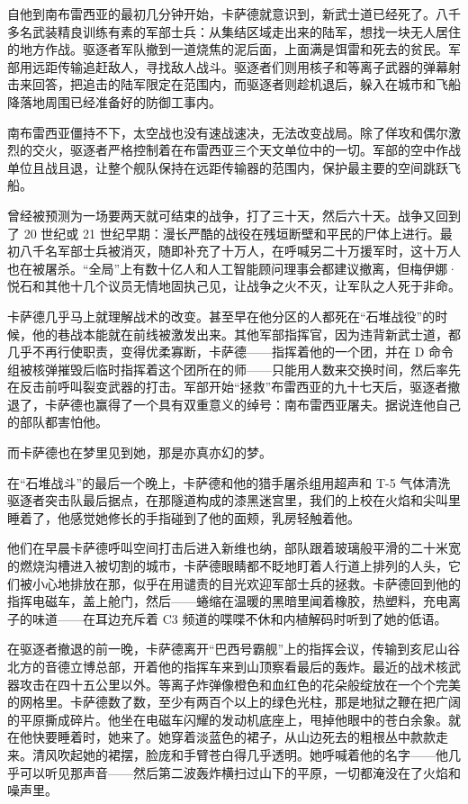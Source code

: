 \documentclass[AutoFakeBold=true]{book}
\begin{document}
自他到南布雷西亚的最初几分钟开始，卡萨德就意识到，新武士道已经死了。八千多名武装精良训练有素的军部士兵：从集结区域走出来的陆军，想找一块无人居住的地方作战。驱逐者军队撤到一道烧焦的泥后面，上面满是饵雷和死去的贫民。军部用远距传输追赶敌人，寻找敌人战斗。驱逐者们则用核子和等离子武器的弹幕射击来回答，把追击的陆军限定在范围内，而驱逐者则趁机退后，躲入在城市和飞船降落地周围已经准备好的防御工事内。

南布雷西亚僵持不下，太空战也没有速战速决，无法改变战局。除了佯攻和偶尔激烈的交火，驱逐者严格控制着在布雷西亚三个天文单位中的一切。军部的空中作战单位且战且退，让整个舰队保持在远距传输器的范围内，保护最主要的空间跳跃飞船。

曾经被预测为一场要两天就可结束的战争，打了三十天，然后六十天。战争又回到了 20 世纪或 21 世纪早期：漫长严酷的战役在残垣断壁和平民的尸体上进行。最初八千名军部士兵被消灭，随即补充了十万人，在呼喊另二十万援军时，这十万人也在被屠杀。``全局''上有数十亿人和人工智能顾问理事会都建议撤离，但梅伊娜·悦石和其他十几个议员无情地固执己见，让战争之火不灭，让军队之人死于非命。

卡萨德几乎马上就理解战术的改变。甚至早在他分区的人都死在``石堆战役''的时候，他的巷战本能就在前线被激发出来。其他军部指挥官，因为违背新武士道，都几乎不再行使职责，变得优柔寡断，卡萨德——指挥着他的一个团，并在 D 命令组被核弹摧毁后临时指挥着这个团所在的师——只能用人数来交换时间，然后率先在反击前呼叫裂变武器的打击。军部开始``拯救''布雷西亚的九十七天后，驱逐者撤退了，卡萨德也赢得了一个具有双重意义的绰号：南布雷西亚屠夫。据说连他自己的部队都害怕他。

而卡萨德也在梦里见到她，那是亦真亦幻的梦。

在``石堆战斗''的最后一个晚上，卡萨德和他的猎手屠杀组用超声和 T-5 气体清洗驱逐者突击队最后据点，在那隧道构成的漆黑迷宫里，我们的上校在火焰和尖叫里睡着了，他感觉她修长的手指碰到了他的面颊，乳房轻触着他。

他们在早晨卡萨德呼叫空间打击后进入新维也纳，部队跟着玻璃般平滑的二十米宽的燃烧沟槽进入被切割的城市，卡萨德眼睛都不眨地盯着人行道上排列的人头，它们被小心地排放在那，似乎在用谴责的目光欢迎军部士兵的拯救。卡萨德回到他的指挥电磁车，盖上舱门，然后——蜷缩在温暖的黑暗里闻着橡胶，热塑料，充电离子的味道——在耳边充斥着 C3 频道的喋喋不休和内植解码时听到了她的低语。

在驱逐者撤退的前一晚，卡萨德离开``巴西号霸舰''上的指挥会议，传输到亥尼山谷北方的音德立博总部，开着他的指挥车来到山顶察看最后的轰炸。最近的战术核武器攻击在四十五公里以外。等离子炸弹像橙色和血红色的花朵般绽放在一个个完美的网格里。卡萨德数了数，至少有两百个以上的绿色光柱，那是地狱之鞭在把广阔的平原撕成碎片。他坐在电磁车闪耀的发动机底座上，甩掉他眼中的苍白余象。就在他快要睡着时，她来了。她穿着淡蓝色的裙子，从山边死去的粗根丛中款款走来。清风吹起她的裙摆，脸庞和手臂苍白得几乎透明。她呼喊着他的名字——他几乎可以听见那声音——然后第二波轰炸横扫过山下的平原，一切都淹没在了火焰和噪声里。
\end{document}
